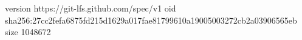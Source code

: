 version https://git-lfs.github.com/spec/v1
oid sha256:27cc2fefa6875fd215d1629a017fae81799610a19005003272cb2a03906565eb
size 1048672
